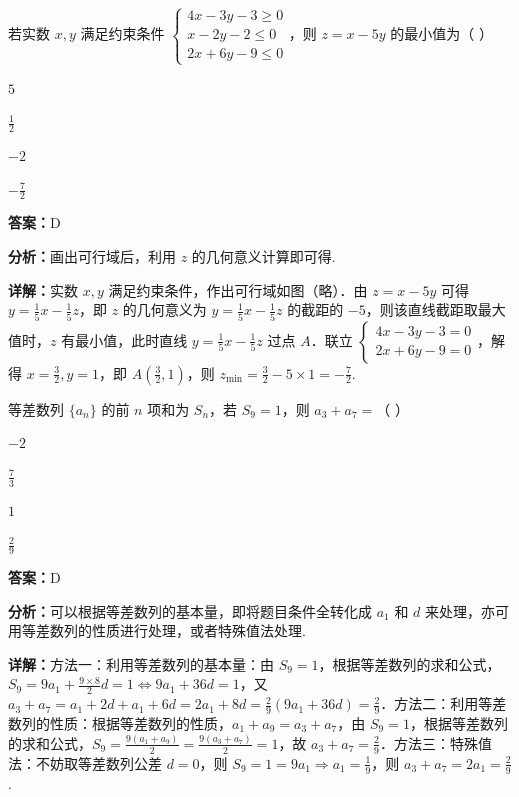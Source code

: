 \begin{question}[points=5]
若实数 $x, y$ 满足约束条件 $\begin{cases} 4x - 3y - 3 \ge 0 \\ x - 2y - 2 \le 0 \\ 2x + 6y - 9 \le 0 \end{cases}$，则 $z = x - 5y$ 的最小值为（ ）
\begin{choices}
  \item $5$
  \item $\frac{1}{2}$
  \item $-2$
  \item $-\frac{7}{2}$
\end{choices}
\begin{solution}
\textbf{答案：}D

\textbf{分析：}画出可行域后，利用 $z$ 的几何意义计算即可得.

\textbf{详解：}实数 $x, y$ 满足约束条件，作出可行域如图（略）．由 $z = x - 5y$ 可得 $y = \frac{1}{5}x - \frac{1}{5}z$，即 $z$ 的几何意义为 $y = \frac{1}{5}x - \frac{1}{5}z$ 的截距的 $-5$，则该直线截距取最大值时，$z$ 有最小值，此时直线 $y = \frac{1}{5}x - \frac{1}{5}z$ 过点 $A$．联立 $\begin{cases} 4x - 3y - 3 = 0 \\ 2x + 6y - 9 = 0 \end{cases}$，解得 $x = \frac{3}{2}, y = 1$，即 $A(\frac{3}{2}, 1)$，则 $z_{\min} = \frac{3}{2} - 5 \times 1 = -\frac{7}{2}$.
\end{solution}
\end{question}

\begin{question}[points=5]
等差数列 $\{a_n\}$ 的前 $n$ 项和为 $S_n$，若 $S_9 = 1$，则 $a_3 + a_7 =$（ ）
\begin{choices}
  \item $-2$
  \item $\frac{7}{3}$
  \item $1$
  \item $\frac{2}{9}$
\end{choices}
\begin{solution}
\textbf{答案：}D

\textbf{分析：}可以根据等差数列的基本量，即将题目条件全转化成 $a_1$ 和 $d$ 来处理，亦可用等差数列的性质进行处理，或者特殊值法处理.

\textbf{详解：}方法一：利用等差数列的基本量：由 $S_9 = 1$，根据等差数列的求和公式，$S_9 = 9a_1 + \frac{9 \times 8}{2}d = 1 \iff 9a_1 + 36d = 1$，又 $a_3 + a_7 = a_1 + 2d + a_1 + 6d = 2a_1 + 8d = \frac{2}{9}(9a_1 + 36d) = \frac{2}{9}$．方法二：利用等差数列的性质：根据等差数列的性质，$a_1 + a_9 = a_3 + a_7$，由 $S_9 = 1$，根据等差数列的求和公式，$S_9 = \frac{9(a_1 + a_9)}{2} = \frac{9(a_3 + a_7)}{2} = 1$，故 $a_3 + a_7 = \frac{2}{9}$．方法三：特殊值法：不妨取等差数列公差 $d = 0$，则 $S_9 = 1 = 9a_1 \Rightarrow a_1 = \frac{1}{9}$，则 $a_3 + a_7 = 2a_1 = \frac{2}{9}$.
\end{solution}
\end{question}

